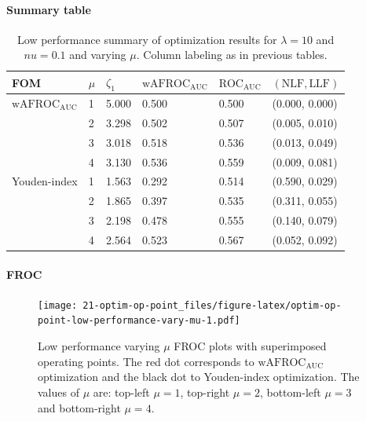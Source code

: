 \documentclass[
]{book}
\begin{document}
\hypertarget{summary-table-5}{%
\paragraph{Summary table}\label{summary-table-5}}

\begin{table}

\caption{\label{tab:optim-op-point-low-performance-vary-mu-table}Low performance summary of optimization results for $\lambda = 10$ and $nu = 0.1$ and varying $\mu$. Column labeling as in previous tables.}
\centering
\fontsize{10}{12}\selectfont
\begin{tabular}[t]{llllll}
\toprule
FOM & $\mu$ & $\zeta_1$ & $\text{wAFROC}_\text{AUC}$ & $\text{ROC}_\text{AUC}$ & $\left( \text{NLF}, \text{LLF}\right)$\\
\midrule
$\text{wAFROC}_\text{AUC}$ & 1 & 5.000 & 0.500 & 0.500 & (0.000, 0.000)\\
 & 2 & 3.298 & 0.502 & 0.507 & (0.005, 0.010)\\
 & 3 & 3.018 & 0.518 & 0.536 & (0.013, 0.049)\\
 & 4 & 3.130 & 0.536 & 0.559 & (0.009, 0.081)\\
Youden-index & 1 & 1.563 & 0.292 & 0.514 & (0.590, 0.029)\\
\addlinespace
 & 2 & 1.865 & 0.397 & 0.535 & (0.311, 0.055)\\
 & 3 & 2.198 & 0.478 & 0.555 & (0.140, 0.079)\\
 & 4 & 2.564 & 0.523 & 0.567 & (0.052, 0.092)\\
\bottomrule
\end{tabular}
\end{table}

\hypertarget{froc-6}{%
\paragraph{FROC}\label{froc-6}}

\begin{figure}
\centering
\texttt{[image: 21-optim-op-point\_files/figure-latex/optim-op-point-low-performance-vary-mu-1.pdf]}
\caption{\label{fig:optim-op-point-low-performance-vary-mu}Low performance varying \(\mu\) FROC plots with superimposed operating points. The red dot corresponds to \(\text{wAFROC}_\text{AUC}\) optimization and the black dot to Youden-index optimization. The values of \(\mu\) are: top-left \(\mu = 1\), top-right \(\mu = 2\), bottom-left \(\mu = 3\) and bottom-right \(\mu = 4\).}
\end{figure}
\end{document}
